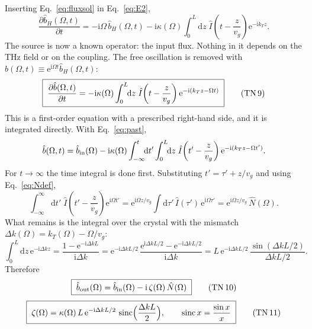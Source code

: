 \documentclass[aps,pra,onecolumn,notitlepage,11pt,amsmath,amssymb,nofootinbib]{revtex4-2}
\newcommand{\Nop}{\hat N}
\newcommand{\Iop}{\hat I}
\newcommand{\dd}{\mathrm{d}}
\newcommand{\ee}{\mathrm{e}}
\newcommand{\ii}{\mathrm{i}}
\newcommand{\sinc}{\operatorname{sinc}}
\newcommand{\TN}[1]{\text{TN\,#1}}
\begin{document}
Inserting Eq.~\eqref{eq:fluxsol} in Eq.~\eqref{eq:E2},
\begin{equation}
\frac{\partial\hat b_H(\Omega,t)}{\partial t}
=-\ii\Omega\,\hat b_H(\Omega,t)
-\ii\kappa(\Omega)\int_0^L\!\!\dd z\;\Iop\!\left(t-\frac{z}{v_g}\right)\ee^{-\ii k_Tz}.
\end{equation}
The source is now a known operator: the input flux. Nothing in it depends on
the THz field or on the coupling. The free oscillation is removed with
$\hat b(\Omega,t)\equiv\ee^{\ii\Omega t}\hat b_H(\Omega,t)$:
\begin{equation}
\boxed{\;\frac{\partial\hat b(\Omega,t)}{\partial t}
=-\ii\kappa(\Omega)\int_0^L\!\!\dd z\;\Iop\!\left(t-\frac{z}{v_g}\right)
\ee^{-\ii(k_Tz-\Omega t)}\;}
\tag{\TN{9}}
\end{equation}
This is a first-order equation with a prescribed right-hand side, and it is
integrated directly. With Eq.~\eqref{eq:past},
\begin{equation}
\hat b(\Omega,t)=\hat b_{\rm in}(\Omega)
-\ii\kappa(\Omega)\int_{-\infty}^{t}\!\!\dd t'\int_0^L\!\!\dd z\;
\Iop\!\left(t'-\frac{z}{v_g}\right)\ee^{-\ii(k_Tz-\Omega t')} .
\label{eq:bt}
\end{equation}
For $t\to\infty$ the time integral is done first. Substituting
$t'=\tau'+z/v_g$ and using Eq.~\eqref{eq:Ndef},
\begin{equation}
\int_{-\infty}^{\infty}\!\!\dd t'\;\Iop\!\left(t'-\frac{z}{v_g}\right)\ee^{\ii\Omega t'}
=\ee^{\ii\Omega z/v_g}\int\!\dd\tau'\,\Iop(\tau')\,\ee^{\ii\Omega\tau'}
=\ee^{\ii\Omega z/v_g}\,\Nop(\Omega).
\end{equation}
What remains is the integral over the crystal with the mismatch
$\Delta k(\Omega)=k_T(\Omega)-\Omega/v_g$:
\begin{equation}
\int_0^L\!\!\dd z\,\ee^{-\ii\Delta kz}=\frac{1-\ee^{-\ii\Delta kL}}{\ii\Delta k}
=\ee^{-\ii\Delta kL/2}\,\frac{\ee^{\ii\Delta kL/2}-\ee^{-\ii\Delta kL/2}}{\ii\Delta k}
=L\,\ee^{-\ii\Delta kL/2}\,\frac{\sin(\Delta kL/2)}{\Delta kL/2}.
\label{eq:zint}
\end{equation}
Therefore
\begin{equation}
\boxed{\;\hat b_{\rm out}(\Omega)=\hat b_{\rm in}(\Omega)-\ii\,\zeta(\Omega)\,\Nop(\Omega)\;}
\tag{\TN{10}}
\end{equation}
\begin{equation}
\boxed{\;\zeta(\Omega)=\kappa(\Omega)\,L\,\ee^{-\ii\Delta kL/2}\,
\sinc\!\Big(\frac{\Delta kL}{2}\Big),\qquad\sinc x=\frac{\sin x}{x}\;}
\tag{\TN{11}}
\end{equation}
\end{document}
